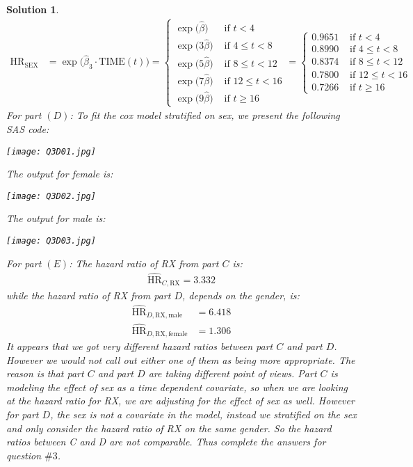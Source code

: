 \documentclass[11pt]{article}
\newtheorem{sol}{Solution}
\begin{document}
\begin{sol}
	\begin{align*}
		\hat{\text{HR}}_{\text{SEX}}
		&= \exp\Big(\hat{\beta}_3\cdot \text{TIME}(t)\Big) = \left\{\begin{array}{ll} \exp\Big(\hat{\beta}\Big)& \text{ if } t < 4\\ \exp\Big(3\hat{\beta}\Big)& \text{ if } 4 \leq t < 8\\ \exp\Big(5\hat{\beta}\Big) &\text{ if }8 \leq t < 12 \\ \exp\Big(7\hat{\beta}\Big)& \text{ if }12 \leq t < 16\\ \exp\Big(9\hat{\beta}\Big)&  \text{ if }t \geq 16\end{array}\right. = \left\{\begin{array}{ll} 0.9651 & \text{ if } t < 4\\ 0.8990& \text{ if } 4 \leq t < 8\\  0.8374&\text{ if }8 \leq t < 12 \\ 0.7800& \text{ if }12 \leq t < 16\\ 0.7266&  \text{ if }t \geq 16\end{array}\right.
	\end{align*}
	For part $(D)$:\vskip 2mm
	To fit the cox model stratified on sex, we present the following SAS code:
	\begin{center}
		\texttt{[image: Q3D01.jpg]}
	\end{center}
	The output for female is:
	\begin{center}
		\texttt{[image: Q3D02.jpg]}
	\end{center}
	The output for male is:
	\begin{center}
		\texttt{[image: Q3D03.jpg]}
	\end{center}
	For part $(E)$:\vskip 2mm
	The hazard ratio of RX from part $C$ is:
	\begin{align*}	
		\hat{\text{HR}}_{C, \text{RX}} = 3.332
	\end{align*}
	while the hazard ratio of RX from part $D$, depends on the gender, is:
	\begin{align*}
		\hat{\text{HR}}_{D, \text{RX}, \text{male}} &= 6.418\\
		\hat{\text{HR}}_{D, \text{RX}, \text{female}} &= 1.306
	\end{align*}
	It appears that we got very different hazard ratios between part $C$ and part $D$. However we would not call out either one of them as being more appropriate. The reason is that part $C$ and part $D$ are taking different point of views. Part $C$ is modeling the effect of sex as a time dependent covariate, so when we are looking at the hazard ratio for RX, we are adjusting for the effect of sex as well. However for part $D$, the sex is not a covariate in the model, instead we stratified on the sex and only consider the hazard ratio of RX on the same gender. So the hazard ratios between C and D are not comparable.\vskip 2mm
	Thus complete the answers for question $\# 3$.
\end{sol}
\end{document}

